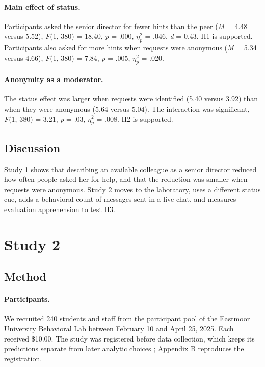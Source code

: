 \documentclass[11pt]{article}
\newcommand{\etap}{\ensuremath{\eta^2_p}}
\begin{document}
\paragraph{Main effect of status.} Participants asked the senior director for fewer hints than the peer (\textit{M} = 4.48 versus 5.52), {\itshape F}(1, 380) = 18.40, \textit{p} = .000, \etap{} = .046, \textit{d} = 0.43. H1 is supported. Participants also asked for more hints when requests were anonymous (\textit{M} = 5.34 versus 4.66), {\itshape F}(1, 380) = 7.84, \textit{p} = .005, \etap{} = .020.

\paragraph{Anonymity as a moderator.} The status effect was larger when requests were identified (5.40 versus 3.92) than when they were anonymous (5.64 versus 5.04). The interaction was significant, {\itshape F}(1, 380) = 3.21, \textit{p} = .03, \etap{} = .008. H2 is supported.

\subsection{Discussion}

Study 1 shows that describing an available colleague as a senior director reduced how often people asked her for help, and that the reduction was smaller when requests were anonymous. Study 2 moves to the laboratory, uses a different status cue, adds a behavioral count of messages sent in a live chat, and measures evaluation apprehension to test H3.

\section{Study 2}

\subsection{Method}

\paragraph{Participants.} We recruited 240 students and staff from the participant pool of the Eastmoor University Behavioral Lab between February 10 and April 25, 2025. Each received \$10.00. The study was registered before data collection, which keeps its predictions separate from later analytic choices \citep{nosek2018}; Appendix B reproduces the registration.
\end{document}
